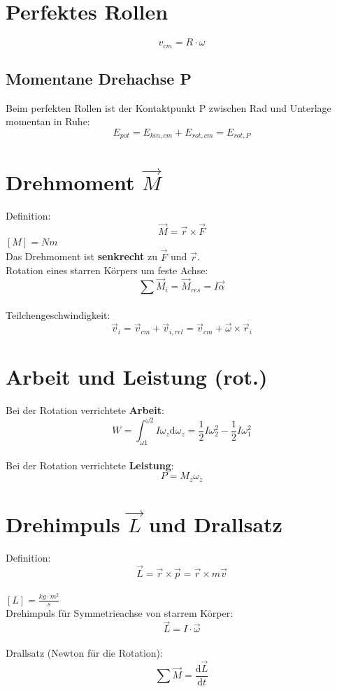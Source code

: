 \newpage

\section{Perfektes Rollen}
\[
	\boxed{
		v_{cm}=R\cdot \omega
	}
\]
\subsection{Momentane Drehachse P}
Beim perfekten Rollen ist der Kontaktpunkt P zwischen Rad und Unterlage momentan in Ruhe:
\[
	\boxed{
		E_{pot}=E_{kin,cm}+E_{rot,cm}=E_{rot,P}
	}
\]

\section{Drehmoment $\vec{M}$}
Definition:
\[
	\boxed{
		\vec{M}=\vec{r} \times \vec{F}
	}
\]
$[M]=Nm$\\
\newline
Das Drehmoment ist \textbf{senkrecht} zu $\vec{F}$ und $\vec{r}$.\\
\newline
Rotation eines starren Körpers um feste Achse:
\[
	\boxed{
		\sum{\vec{M}_i}=\vec{M}_{res} = I\vec{\alpha}
	}
\]\\
\newline
Teilchengeschwindigkeit:
\[
	\boxed{
		\vec{v}_i=\vec{v}_{cm}+\vec{v}_{i,rel}=\vec{v}_{cm}+\vec{\omega}\times\vec{r}_i
	}
\]

\section{Arbeit und Leistung (rot.)}
Bei der Rotation verrichtete \textbf{Arbeit}:
\[
	\boxed{
		W=\int_{\omega 1}^{\omega 2}{I\omega_z\mathrm{d}\omega_z}=\frac{1}{2}I\omega_2^2-\frac{1}{2}I\omega_1^2
	}
\]\\
\newline
Bei der Rotation verrichtete \textbf{Leistung}:
\[
	\boxed{
		P=M_z\omega_z
	}
\]

\section{Drehimpuls $\vec{L}$ und Drallsatz}
Definition:
\[
	\boxed{
		\vec{L}=\vec{r}\times\vec{p}=\vec{r}\times m\vec{v}
	}
\]\\
$[L]=\frac{kg\cdot m^2}{s}$\\
\newline
Drehimpuls für Symmetrieachse von starrem Körper:
\[
	\boxed{
		\vec{L}=I\cdot\vec{\omega}
	}
\]\\
\newline
Drallsatz (Newton für die Rotation):
\[
	\boxed{
		\sum{\vec{M}}=\frac{\mathrm{d}\vec{L}}{\mathrm{d}t}
	}
\]
\newpage
